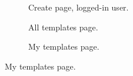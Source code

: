 \begin{figure}
\begin{subfigure}{0.45\textwidth}
        \caption{Create page, logged-in user.}
        \label{fig:wireframes-create-logged}
    \end{subfigure}
    \begin{subfigure}{0.45\textwidth}
        \centering
        \caption{All templates page.}
        \label{fig:wireframes-all-templates}
    \end{subfigure}
    \hspace{1cm}
    \begin{subfigure}{0.45\textwidth}
        \centering
        \caption{My templates page.}
        \label{fig:wireframes-my-templates}
    \end{subfigure}

\end{figure}
